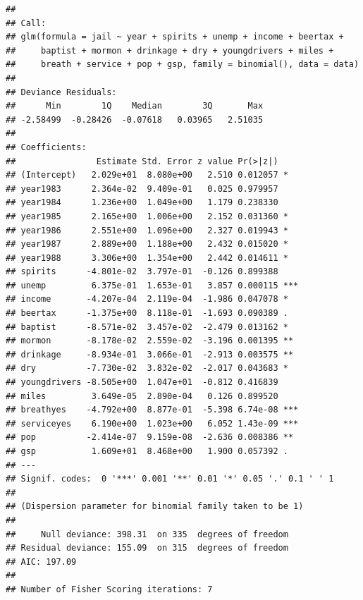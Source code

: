 \documentclass[]{article}
\newenvironment{Shaded}{\begin{snugshade}}{\end{snugshade}}
\newcommand{\CommentTok}[1]{\textcolor[rgb]{0.56,0.35,0.01}{\textit{#1}}}
\newcommand{\DataTypeTok}[1]{\textcolor[rgb]{0.13,0.29,0.53}{#1}}
\newcommand{\KeywordTok}[1]{\textcolor[rgb]{0.13,0.29,0.53}{\textbf{#1}}}
\newcommand{\NormalTok}[1]{#1}
\newcommand{\OperatorTok}[1]{\textcolor[rgb]{0.81,0.36,0.00}{\textbf{#1}}}
\newcommand{\StringTok}[1]{\textcolor[rgb]{0.31,0.60,0.02}{#1}}
\begin{document}
\begin{verbatim}
## 
## Call:
## glm(formula = jail ~ year + spirits + unemp + income + beertax + 
##     baptist + mormon + drinkage + dry + youngdrivers + miles + 
##     breath + service + pop + gsp, family = binomial(), data = data)
## 
## Deviance Residuals: 
##      Min        1Q    Median        3Q       Max  
## -2.58499  -0.28426  -0.07618   0.03965   2.51035  
## 
## Coefficients:
##                Estimate Std. Error z value Pr(>|z|)    
## (Intercept)   2.029e+01  8.080e+00   2.510 0.012057 *  
## year1983      2.364e-02  9.409e-01   0.025 0.979957    
## year1984      1.236e+00  1.049e+00   1.179 0.238330    
## year1985      2.165e+00  1.006e+00   2.152 0.031360 *  
## year1986      2.551e+00  1.096e+00   2.327 0.019943 *  
## year1987      2.889e+00  1.188e+00   2.432 0.015020 *  
## year1988      3.306e+00  1.354e+00   2.442 0.014611 *  
## spirits      -4.801e-02  3.797e-01  -0.126 0.899388    
## unemp         6.375e-01  1.653e-01   3.857 0.000115 ***
## income       -4.207e-04  2.119e-04  -1.986 0.047078 *  
## beertax      -1.375e+00  8.118e-01  -1.693 0.090389 .  
## baptist      -8.571e-02  3.457e-02  -2.479 0.013162 *  
## mormon       -8.178e-02  2.559e-02  -3.196 0.001395 ** 
## drinkage     -8.934e-01  3.066e-01  -2.913 0.003575 ** 
## dry          -7.730e-02  3.832e-02  -2.017 0.043683 *  
## youngdrivers -8.505e+00  1.047e+01  -0.812 0.416839    
## miles         3.649e-05  2.890e-04   0.126 0.899520    
## breathyes    -4.792e+00  8.877e-01  -5.398 6.74e-08 ***
## serviceyes    6.190e+00  1.023e+00   6.052 1.43e-09 ***
## pop          -2.414e-07  9.159e-08  -2.636 0.008386 ** 
## gsp           1.609e+01  8.468e+00   1.900 0.057392 .  
## ---
## Signif. codes:  0 '***' 0.001 '**' 0.01 '*' 0.05 '.' 0.1 ' ' 1
## 
## (Dispersion parameter for binomial family taken to be 1)
## 
##     Null deviance: 398.31  on 335  degrees of freedom
## Residual deviance: 155.09  on 315  degrees of freedom
## AIC: 197.09
## 
## Number of Fisher Scoring iterations: 7
\end{verbatim}

\begin{Shaded}
\end{Shaded}
\end{document}

